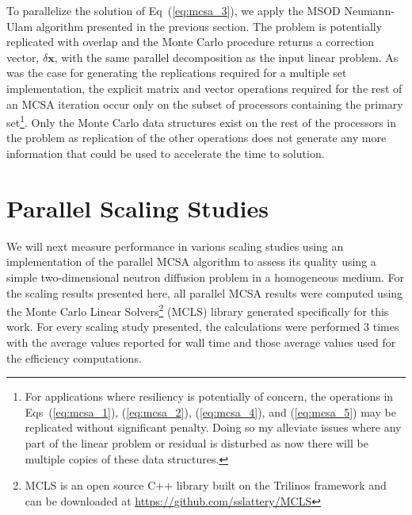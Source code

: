 \documentclass{snamc2013}
\begin{document}
To parallelize the solution of Eq~(\ref{eq:mcsa_3}), we apply the
MSOD Neumann-Ulam algorithm presented in the previous section. The
problem is potentially replicated with overlap and the Monte Carlo
procedure returns a correction vector, $\delta \mathbf{x}$, with the same
parallel decomposition as the input linear problem. As was the case
for generating the replications required for a multiple set
implementation, the explicit matrix and vector operations required for
the rest of an MCSA iteration occur only on the subset of processors
containing the primary set\footnote{For applications where resiliency
  is potentially of concern, the operations in Eqs~(\ref{eq:mcsa_1}),
  (\ref{eq:mcsa_2}), (\ref{eq:mcsa_4}), and (\ref{eq:mcsa_5}) may
  be replicated without significant penalty. Doing so my alleviate
  issues where any part of the linear problem or residual is disturbed
  as now there will be multiple copies of these data
  structures.}. Only the Monte Carlo data structures exist on the rest
of the processors in the problem as replication of the other
operations does not generate any more information that could be used
to accelerate the time to solution.

\section{Parallel Scaling Studies}
We will next measure performance in various scaling studies using an
implementation of the parallel MCSA algorithm to assess its quality
using a simple two-dimensional neutron diffusion problem in a
homogeneous medium. For the scaling results presented here, all
parallel MCSA results were computed using the Monte Carlo Linear
Solvers\footnote{MCLS is an open source C++ library built on the
  Trilinos\cite{heroux_overview_2005} framework and can be downloaded
  at \url{https://github.com/sslattery/MCLS}} (MCLS) library generated
specifically for this work. For every scaling study presented, the
calculations were performed 3 times with the average values reported
for wall time and those average values used for the efficiency
computations. 
\end{document}
